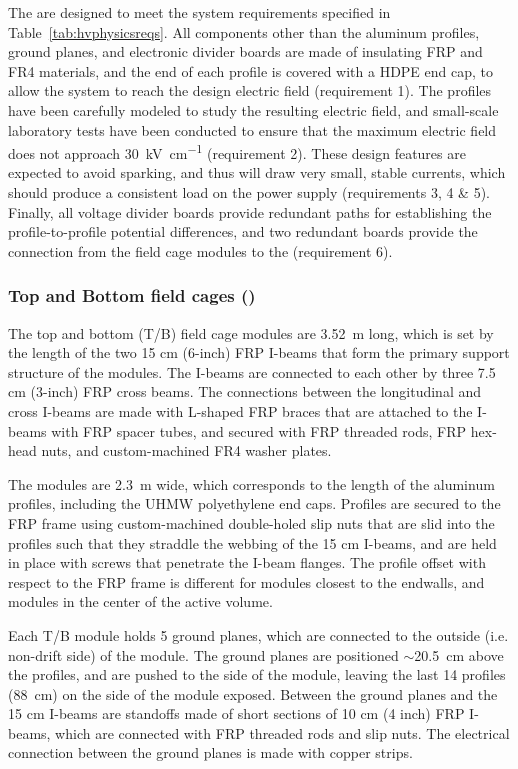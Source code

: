 The  %
are designed to %
meet the system requirements specified in Table~\ref{tab:hvphysicsreqs}. All components other than the aluminum profiles, ground planes, and electronic divider boards are made of insulating FRP and FR4 materials, and the end of each profile is covered with a HDPE end cap, to allow the system to reach the design  electric field (requirement 1). The profiles have been carefully modeled to study the resulting electric field, and small-scale laboratory tests have been conducted to ensure that the maximum electric field does not approach \SI{30}{\kilo\volt\per\centi\meter} (requirement 2). These design features are expected to avoid sparking, and thus will draw very small, stable currents, which should produce a consistent load on the power supply (requirements 3, 4 \& 5). Finally, all voltage divider boards provide redundant paths for establishing the profile-to-profile potential differences, and two redundant boards provide the connection from the field cage modules to the  (requirement 6).

\subsubsection{Top and Bottom field cages ()}

The top and bottom (T/B) field cage modules are 3.52~m long, which is set by the length of the two 15 cm (6-inch) FRP I-beams that form the primary support structure of the modules. The I-beams are connected to each other by three  7.5 cm (3-inch) FRP cross beams. The connections between the longitudinal and cross I-beams are made with L-shaped FRP braces that are attached to the I-beams with FRP spacer tubes, and secured with FRP threaded rods, FRP hex-head nuts, and custom-machined FR4 washer plates.

The modules are 2.3~m wide, which corresponds to the length of the aluminum profiles, including the UHMW polyethylene end caps. Profiles are secured to the FRP frame using custom-machined double-holed slip nuts that are slid into the profiles such that they straddle the webbing of the 15 cm I-beams, and are held in place with screws that penetrate the I-beam flanges. The profile offset with respect to the FRP frame is different for modules closest to the endwalls, and modules in the center of the active volume.

Each T/B module holds 5 ground planes, which are connected to the outside (i.e. non-drift side) of the module. The ground planes are positioned $\sim$20.5~cm above the profiles, and are pushed to the  side of the module, leaving the last 14 profiles (88~cm) on the  side of the module exposed. Between the ground planes and the 15 cm I-beams are standoffs made of short sections of 10 cm (4 inch)  FRP I-beams, which are connected with FRP threaded rods and slip nuts. The electrical connection between the ground planes is made with copper strips.

